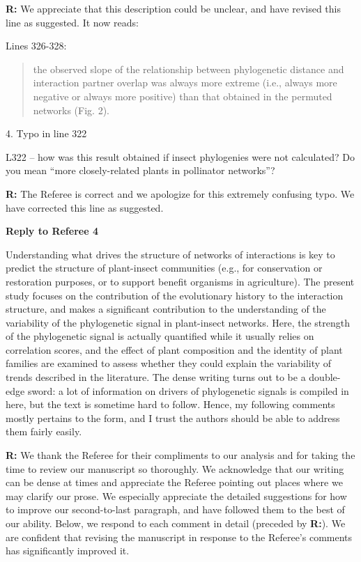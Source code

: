 \documentclass[12pt]{letter}
\newenvironment{refquote}{\bigskip \begin{it}}{\end{it}\smallskip}
\begin{document}
		\textbf{R:} We appreciate that this description could be unclear, and have revised this line as suggested. It now reads:

		Lines 326-328:

		\begin{quotation}

			the observed 
			slope of the relationship between phylogenetic distance and interaction 
			partner overlap was always more extreme (i.e., always more negative or 
			always more positive) than that obtained in the permuted networks (Fig. 2).

	    \end{quotation}


	4. Typo in line 322 

		\begin{refquote}
			L322 – how was this result obtained if insect phylogenies were not calculated? Do you mean “more closely-related plants in pollinator networks”?
		\end{refquote}


		\textbf{R:} The Referee is correct and we apologize for this extremely confusing typo. We have corrected this line as suggested.


\clearpage


{\Large \bf Reply to Referee 4} 

	\begin{refquote}
		Understanding what drives the structure of networks of interactions is key to predict the structure of plant-insect communities (e.g., for conservation or restoration purposes, or to support benefit organisms in agriculture).
		The present study focuses on the contribution of the evolutionary history to the interaction structure, and makes a significant contribution to the understanding of the variability of the phylogenetic signal in plant-insect networks. Here, the strength of the phylogenetic signal is actually quantified while it usually relies on correlation scores, and the effect of plant composition and the identity of plant families are examined to assess whether they could explain the variability of trends described in the literature.
		The dense writing turns out to be a double-edge sword: a lot of information on drivers of phylogenetic signals is compiled in here, but the text is sometime hard to follow. Hence, my following comments mostly pertains to the form, and I trust the authors should be able to address them fairly easily.
	\end{refquote}


	\textbf{R:} We thank the Referee for their compliments to our analysis and for taking the time to review our manuscript so thoroughly. We acknowledge that our writing can be dense at times and appreciate the Referee pointing out places where we may clarify our prose. We especially appreciate the detailed suggestions for how to improve our second-to-last paragraph, and have followed them to the best of our ability. Below, we respond to each comment in detail (preceded by \textbf{R:}). We are confident that revising the manuscript in response to the Referee's comments has significantly improved it.
\end{document}
